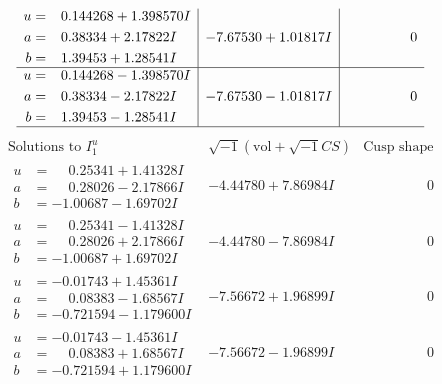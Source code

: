 \documentclass[1p]{elsarticle_modified}
\theoremstyle{definition}
\newcommand{\I}{\sqrt{-1}}
\begin{document}
$$\begin{array}{c|c|c}
\begin{aligned}
u &= \phantom{-}0.144268 + 1.398570 I \\
a &= \phantom{-}0.38334 + 2.17822 I \\
b &= \phantom{-}1.39453 + 1.28541 I\end{aligned}
 & -7.67530 + 1.01817 I & \phantom{-0.000000 } 0 \\ \hline\begin{aligned}
u &= \phantom{-}0.144268 - 1.398570 I \\
a &= \phantom{-}0.38334 - 2.17822 I \\
b &= \phantom{-}1.39453 - 1.28541 I\end{aligned}
 & -7.67530 - 1.01817 I & \phantom{-0.000000 } 0\\
 \hline 
 \end{array}$$\newpage$$\begin{array}{c|c|c}  
\text{Solutions to }I^u_{1}& \I (\text{vol} + \sqrt{-1}CS) & \text{Cusp shape}\\
 \hline 
\begin{aligned}
u &= \phantom{-}0.25341 + 1.41328 I \\
a &= \phantom{-}0.28026 - 2.17866 I \\
b &= -1.00687 - 1.69702 I\end{aligned}
 & -4.44780 + 7.86984 I & \phantom{-0.000000 } 0 \\ \hline\begin{aligned}
u &= \phantom{-}0.25341 - 1.41328 I \\
a &= \phantom{-}0.28026 + 2.17866 I \\
b &= -1.00687 + 1.69702 I\end{aligned}
 & -4.44780 - 7.86984 I & \phantom{-0.000000 } 0 \\ \hline\begin{aligned}
u &= -0.01743 + 1.45361 I \\
a &= \phantom{-}0.08383 - 1.68567 I \\
b &= -0.721594 - 1.179600 I\end{aligned}
 & -7.56672 + 1.96899 I & \phantom{-0.000000 } 0 \\ \hline\begin{aligned}
u &= -0.01743 - 1.45361 I \\
a &= \phantom{-}0.08383 + 1.68567 I \\
b &= -0.721594 + 1.179600 I\end{aligned}
 & -7.56672 - 1.96899 I & \phantom{-0.000000 } 0 \\ \hline\begin{aligned}

\end{aligned}
\end{array}$$
\end{document}
